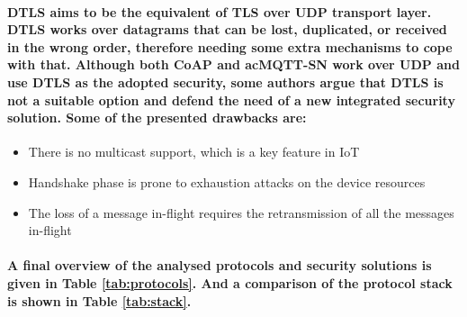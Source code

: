 \paragraph{
	\ac{DTLS} aims to be the equivalent of \ac{TLS} over \ac{UDP} transport layer. \ac{DTLS} works over datagrams that can be lost, duplicated, or received in the wrong order, therefore needing some extra mechanisms to cope with that. Although both \ac{CoAP} and ac{MQTT-SN} work over \ac{UDP} and use \ac{DTLS} as the adopted security, some authors argue that \ac{DTLS} is not a suitable option \cite{Alghamdi2013} and defend the need of a new integrated security solution. Some of the presented drawbacks are:
}

\begin{itemize}
	\item There is no multicast support, which is a key feature in \ac{IoT}
	\item Handshake phase is prone to exhaustion attacks on the device resources
	\item The loss of a message in-flight requires the retransmission of all the messages in-flight
\end{itemize}

\paragraph{
	A final overview of the analysed protocols and security solutions is given in Table \ref{tab:protocols}. And a comparison of the protocol stack is shown in Table \ref{tab:stack}.
} 


